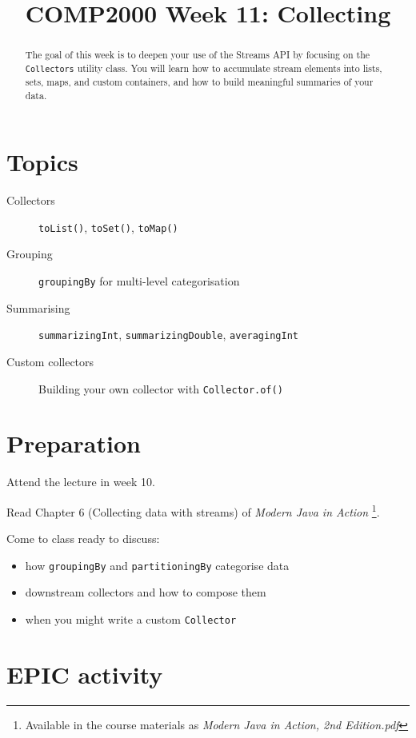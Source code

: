 \documentclass[twoside=false,DIV=14]{scrartcl}
\title{\color{redish} \vspace{-1em}COMP2000 Week 11: Collecting}
\begin{document}
{\color{blackish}\maketitle}\vspace{-7em}

\begin{abstract}
The goal of this week is to deepen your use of the Streams API by focusing on the \texttt{Collectors} utility class.  You will learn how to accumulate stream elements into lists, sets, maps, and custom containers, and how to build meaningful summaries of your data.
\end{abstract}

\section*{Topics}
\begin{description}
\item[Collectors] \texttt{toList()}, \texttt{toSet()}, \texttt{toMap()}
\item[Grouping] \texttt{groupingBy} for multi-level categorisation
\item[Summarising] \texttt{summarizingInt}, \texttt{summarizingDouble}, \texttt{averagingInt}
\item[Custom collectors] Building your own collector with \texttt{Collector.of()}
\end{description}

\section*{Preparation}
Attend the lecture in week 10.\par
Read Chapter 6 (Collecting data with streams) of \textit{Modern Java in Action}
\footnote{Available in the course materials as \textit{Modern Java in Action, 2nd Edition.pdf}}.

Come to class ready to discuss:
\begin{itemize}
    \item how \texttt{groupingBy} and \texttt{partitioningBy} categorise data
    \item downstream collectors and how to compose them
    \item when you might write a custom \texttt{Collector}
\end{itemize}


\section*{EPIC activity}
\end{document}
